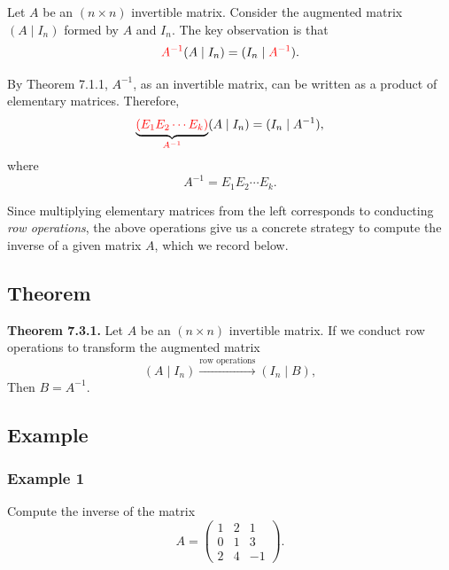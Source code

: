 \documentclass[12pt]{article}
\begin{document}
Let $A$ be an $(n\times n)$ invertible matrix. Consider the augmented matrix
$(A\mid I_n)$ formed by $A$ and $I_n$. The key observation is that
\[
\textcolor{red}{A^{-1}}(A\mid I_n)=(I_n\mid \textcolor{red}{A^{-1}}).
\]

By Theorem 7.1.1, $A^{-1}$, as an invertible matrix, can be written as a
product of elementary matrices. Therefore,
\[
\underbrace{\textcolor{red}{(E_1E_2\cdots E_k)}}_{\textcolor{red}{A^{-1}}}(A\mid I_n)=(I_n\mid A^{-1}),
\]
where
\[
A^{-1}=E_1E_2\cdots E_k.
\]

Since multiplying elementary matrices from the left corresponds to
conducting \emph{row operations}, the above operations give us a concrete
strategy to compute the inverse of a given matrix $A$, which we record below.

\subsection{Theorem}

\textbf{Theorem 7.3.1.}
Let $A$ be an $(n\times n)$ invertible matrix. If we conduct row operations
to transform the augmented matrix
\[
(A\mid I_n)\xrightarrow{\text{row operations}}(I_n\mid B),
\]
Then $B=A^{-1}$.
\subsection{Example}
\subsubsection{Example 1}
Compute the inverse of the matrix
\[
A=
\begin{pmatrix}
1 & 2 & 1\\
0 & 1 & 3\\
2 & 4 & -1
\end{pmatrix}.
\]
\end{document}
